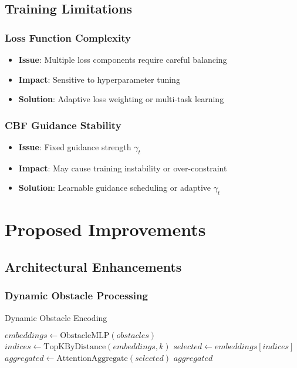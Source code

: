 \documentclass[12pt]{article}
\begin{document}
\subsection{Training Limitations}

\subsubsection{Loss Function Complexity}

\begin{itemize}
    \item \textbf{Issue}: Multiple loss components require careful balancing
    \item \textbf{Impact}: Sensitive to hyperparameter tuning
    \item \textbf{Solution}: Adaptive loss weighting or multi-task learning
\end{itemize}

\subsubsection{CBF Guidance Stability}

\begin{itemize}
    \item \textbf{Issue}: Fixed guidance strength $\gamma_t$
    \item \textbf{Impact}: May cause training instability or over-constraint
    \item \textbf{Solution}: Learnable guidance scheduling or adaptive $\gamma_t$
\end{itemize}

\section{Proposed Improvements}

\subsection{Architectural Enhancements}

\subsubsection{Dynamic Obstacle Processing}

\begin{algorithm}
\caption{Dynamic Obstacle Encoding}
\begin{algorithmic}[1]
\State $embeddings \gets \text{ObstacleMLP}(obstacles)$
\State $indices \gets \text{TopKByDistance}(embeddings, k)$
\State $selected \gets embeddings[indices]$
\State $aggregated \gets \text{AttentionAggregate}(selected)$
\Return $aggregated$
\EndProcedure
\end{algorithmic}
\end{algorithm}
\end{document}
